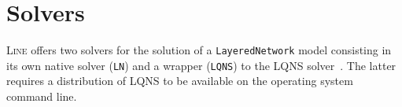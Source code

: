 
\section{Solvers}
\textsc{Line} offers two solvers for the solution of a \texttt{LayeredNetwork} model consisting in its own native solver (\texttt{LN}) and a wrapper (\texttt{LQNS}) to the LQNS solver~\cite{lqns12}. The latter requires a distribution of LQNS to be available on the operating system command line.

